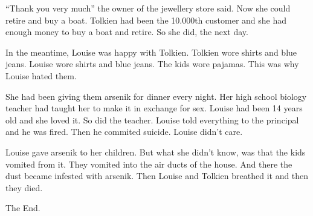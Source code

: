 ``Thank you very much'' the owner of the jewellery store said. Now
she could retire and buy a boat. Tolkien had been the 10.000th
customer and she had enough money to buy a boat and retire. So she
did, the next day.



In the meantime, Louise was happy with Tolkien. Tolkien wore shirts
and blue jeans. Louise wore shirts and blue jeans. The kids wore
pajamas. This was why Louise hated them.



She had been giving them arsenik for dinner every night. Her high
school biology teacher had taught her to make it in exchange for
sex. Louise had been 14 years old and she loved it. So did the
teacher. Louise told everything to the principal and he was fired.
Then he commited suicide. Louise didn't care.



Louise gave arsenik to her children. But what she didn't know, was
that the kids vomited from it. They vomited into the air ducts of
the house. And there the dust became infested with arsenik. Then
Louise and Tolkien breathed it and then they died.



The End. 
 



